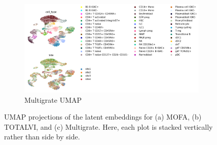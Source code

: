 \documentclass{article}
\begin{document}
\begin{figure}[h]
    \vspace{1em}
    \begin{subfigure}{0.8\linewidth}
        \centering
        \includegraphics[width=\linewidth]{multigrate_integration}
        \caption{Multigrate UMAP}
        \label{fig:multigrateintegration}
    \end{subfigure}
    \caption{UMAP projections of the latent embeddings for (a) MOFA, (b) TOTALVI, and (c) Multigrate. 
    Here, each plot is stacked vertically rather than side by side.}
\end{figure}


\end{document}
